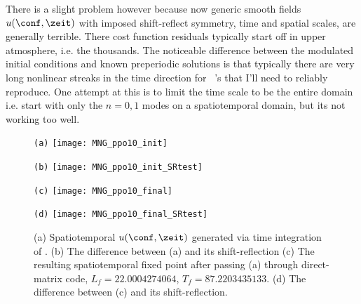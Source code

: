 \begin{description}
{There is a slight problem however because now generic smooth fields $u(\conf,\zeit)$ with
imposed shift-reflect symmetry, time and spatial scales, are generally terrible. There cost function
residuals typically start off in upper atmosphere, i.e. the thousands. The noticeable difference
between the modulated initial conditions and known preperiodic solutions is that typically there
are very long nonlinear streaks in the time direction for \ppo\ 's that I'll need to reliably
reproduce. One attempt at this is to limit the time scale to be the entire domain i.e. start with only the $n=0,1$ modes on a spatiotemporal domain, but
its not working too well.
}



\begin{figure}
\begin{minipage}[height=.32\textheight]{.5\textwidth}
\centering \small{\texttt{(a)}}
\texttt{[image: MNG\_ppo10\_init]}
\end{minipage}
\begin{minipage}[height=.32\textheight]{.5\textwidth}
\centering \small{\texttt{(b)}}
\texttt{[image: MNG\_ppo10\_init\_SRtest]}
\end{minipage}
\begin{minipage}[height=.32\textheight]{.5\textwidth}
\centering \small{\texttt{(c)}}
\texttt{[image: MNG\_ppo10\_final]}
\end{minipage}
\begin{minipage}[height=.32\textheight]{.5\textwidth}
\centering \small{\texttt{(d)}}
\texttt{[image: MNG\_ppo10\_final\_SRtest]}
\end{minipage}
\caption{ \label{fig:MNGSRppo10fixed}
(a) Spatiotemporal $u(\conf,\zeit)$ generated via time integration of
.
(b) The difference between (a) and its shift-reflection
(c) The resulting spatiotemporal fixed point after passing (a) through direct-matrix code,
$L_f=22.0004274064$, $T_f=87.2203435133$.
(d) The difference between (c) and its shift-reflection.
}
\end{figure}


\end{description}
